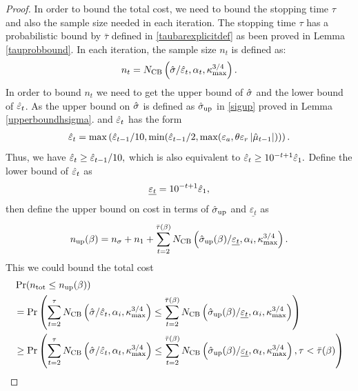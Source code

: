 \documentclass{iitthesis}
\theoremstyle{definition}
\begin{document}
\begin{proof}
 In order to bound the total cost, we need to bound the stopping time $\tau$ and also the sample size needed in each iteration. The stopping time $\tau$ has a probabilistic bound by $\bar{\tau}$ defined in \eqref{taubarexplicitdef} as been proved in Lemma \ref{tauprobbound}. In each iteration, the sample size $n_t$ is defined as:
$$n_t = N_{\text{CB}}\left(\hat{\sigma}/\hat{\varepsilon}_t,\alpha_t,\kappa_{\max}^{3/4}\right).$$
In order to bound $n_t$ we need to get the upper bound of $\hat{\sigma}$ and the lower bound of $\hat{\varepsilon}_t$. As the upper bound on $\hat{\sigma}$ is defined as $\hat{\sigma}_{\operatorname{up}}$ in \eqref{sigup} proved in Lemma \ref{upperboundhsigma}. and $\hat{\varepsilon}_t$ has the form
\begin{align*}
\hat{\varepsilon}_t= \max \left( \hat{\varepsilon}_{t-1}/10, \min(\hat{\varepsilon}_{t-1}/2, \max(\varepsilon_a,\theta\varepsilon_r\left \lvert \hat{\mu}_{t-1} \right \rvert)) \right).
\end{align*}
Thus, we have $\hat{\varepsilon}_t \geq \hat{\varepsilon}_{t-1}/10,$ which is also equivalent to $\hat{\varepsilon}_t \geq 10^{-t+1} \hat{\varepsilon}_1.$ 		Define the lower bound of $\hat{\varepsilon}_t$ as
$$\underline{\varepsilon_t} = 10^{-t+1}\hat{\varepsilon}_1,$$
then define the upper bound on cost in terms of $\hat{\sigma}_{\operatorname{up}}$ and $\underline{\varepsilon_t}$ as
\begin{equation}
n_{\operatorname{up}}(\beta) =n_\sigma+ n_1+\sum_{t=2}^{\bar{\tau}(\beta)} N_{\text{CB}}\left(\hat{\sigma}_{\operatorname{up}}(\beta)/ \underline{\varepsilon_t},\alpha_i,\kappa_{\max}^{3/4}\right).
\end{equation}
This we could bound the total cost
\begin{align*}
&\Pr(n_{\tot} \leq n_{\up}(\beta))\\
 &= \Pr\left(\sum_{t=2}^\tau  N_{\CB}\left(\hsigma/ \heps_t, \alpha_i,\kmax^{3/4}\right)  \leq \sum_{t=2}^{\bar{\tau}(\beta)} N_{\CB}\left(\hsigma_{\up}(\beta)/ \underline{\varepsilon_t},\alpha_i,\kmax^{3/4}\right) \right)\\
&\geq \Pr\left(\sum_{t=2}^\tau  N_{\CB}\left(\hsigma/ \heps_t, \alpha_t,\kmax^{3/4}\right)  \leq \sum_{t=2}^{\bar{\tau}(\beta)} N_{\CB}\left(\hsigma_{\up}(\beta)/ \underline{\varepsilon_t},\alpha_t,\kmax^{3/4}\right),\tau <\bar{\tau}(\beta) \right)\\

\end{align*}
\end{proof}
\end{document}
